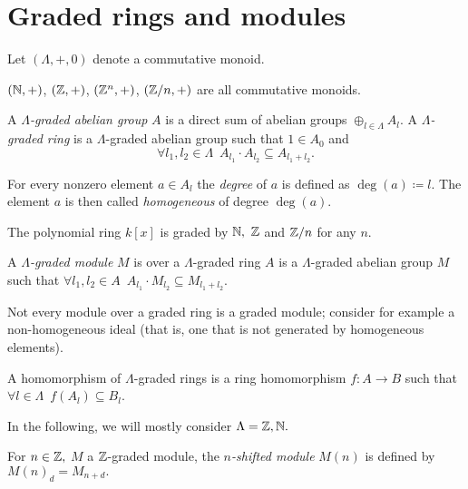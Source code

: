 \section{Graded rings and modules}
Let \((\Lambda, +, 0)\) denote a commutative monoid.

\begin{example}
  \((\mathbb N, +)\), \((\mathbb Z, +)\), \((\mathbb Z^n, +)\), \((\mathbb Z/{n}, +)\) are all commutative monoids.
\end{example}

\begin{df}
  A \emph{\(\Lambda\)-graded abelian group} \(A\) is a direct sum of abelian groups
  \(\oplus_{l \in \Lambda} A_l\).
  A \emph{\(\Lambda\)-graded ring} is a \(\Lambda\)-graded abelian group such that \(1 \in A_0\) and
  \[\forall l_1, l_2 \in \Lambda \enspace A_{l_1} \cdot A_{l_2} \subseteq A_{l_1 + l_2}.\]
\end{df}

\begin{df}
  For every nonzero element \(a \in A_l\) the \emph{degree} of \(a\) is defined as
  \(\deg(a) \coloneqq l.\)
  The element \(a\) is then called \emph{homogeneous} of degree \(\deg(a).\)
\end{df}

\begin{example}
  The polynomial ring \(k[x]\) is graded by \(\mathbb N,\) \(\mathbb Z\) and \(\mathbb Z/{n}\) for any \(n.\)
\end{example}

\begin{df}
  A \emph{\(\Lambda\)-graded module} \(M\) is over a \(\Lambda\)-graded ring \(A\) is a \(\Lambda\)-graded abelian group \(M\) such that
  \(\forall l_1, l_2 \in A \enspace A_{l_1} \cdot M_{l_2} \subseteq M_{l_1 + l_2}.\)
\end{df}

Not every module over a graded ring is a graded module; consider for example a non-homogeneous ideal (that is, one that is not generated by homogeneous elements).

\begin{df}
  A homomorphism of \(\Lambda\)-graded rings is a ring homomorphism \(f \colon A \to B\) such that
  \(\forall l \in \Lambda \enspace f(A_l) \subseteq B_l\).
\end{df}

In the following, we will mostly consider \(\Lambda = \mathbb Z, \mathbb N.\)

\begin{df}
  For \(n \in \mathbb Z,\) \(M\) a \(\mathbb Z\)-graded module, the \emph{\(n\)-shifted module} \(M(n)\) is defined by
  \(M(n)_d = M_{n+d}.\)
\end{df}

